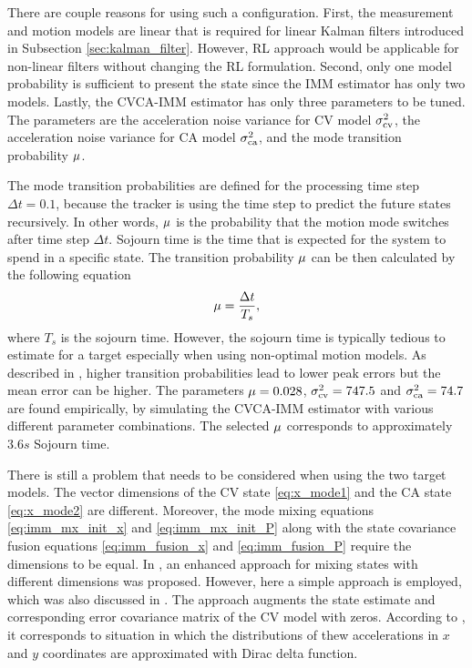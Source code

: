 \documentclass[english, 12pt, a4paper, elec, utf8, a-1b, online]{aaltothesis}
\newcommand{\dt}{\Delta t}
\begin{document}
There are couple reasons for using such a configuration.
First, the measurement and motion models are linear that is required for linear Kalman filters introduced in Subsection \ref{sec:kalman_filter}.
However, RL approach would be applicable for non-linear filters without changing the RL formulation.
Second, only one model probability is sufficient to present the state since the IMM estimator has only two models.
Lastly, the CVCA-IMM estimator has only three parameters to be tuned.
The parameters are the acceleration noise variance for CV model $\sigma_\text{cv}^2$, the acceleration noise variance for CA model $\sigma_\text{ca}^2$, and the mode transition probability $\mu$.

The mode transition probabilities are defined for the processing time step $\dt=0.1$, because the tracker is using the time step to predict the future states recursively.
In other words, $\mu$ is the probability that the motion mode switches after time step $\dt$.
Sojourn time is the time that is expected for the system to spend in a specific state.
The transition probability $\mu$ can be then calculated by the following equation
\begin{equation}
   \msp = \frac{\dt}{T_s},
\end{equation}
where $T_s$ is the sojourn time.
However, the sojourn time is typically tedious to estimate for a target especially when using non-optimal motion models.
As described in \cite{Simeonova2002}, higher transition probabilities lead to lower peak errors but the mean error can be higher.
The parameters $\mu=0.028$, $\sigma_\text{cv}^2=747.5$ and $\sigma_\text{ca}^2=74.7$ are found empirically, by simulating the CVCA-IMM estimator with various different parameter combinations.
The selected $\mu$ corresponds to approximately $3.6s$ Sojourn time.

There is still a problem that needs to be considered when using the two target models.
The vector dimensions of the CV state \eqref{eq:x_mode1} and the CA state \eqref{eq:x_mode2} are different. 
Moreover, the mode mixing equations \eqref{eq:imm_mx_init_x} and \eqref{eq:imm_mx_init_P} along with the state covariance fusion equations \eqref{eq:imm_fusion_x} and \eqref{eq:imm_fusion_P} require the dimensions to be equal.
In \cite{Granstroem2015}, an enhanced approach for mixing states with different dimensions was proposed.
However, here a simple approach is employed, which was also discussed in \cite{Granstroem2015}.
The approach augments the state estimate and corresponding error covariance matrix of the CV model with zeros.
According to \cite{Granstroem2015}, it corresponds to situation in which the distributions of thew accelerations in $x$ and $y$ coordinates are approximated with Dirac delta function.
\end{document}
